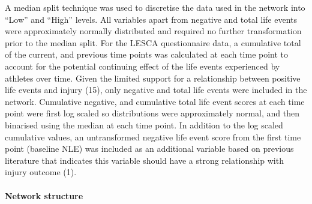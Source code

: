 \documentclass[
  english,
  man]{apa6}
\let\oldparagraph\paragraph
\renewcommand{\paragraph}[1]{\oldparagraph{#1}\mbox{}}
\begin{document}
A median split technique was used to discretise the data used in the network into ``Low'' and ``High'' levels.
All variables apart from negative and total life events were approximately normally distributed and required no further transformation prior to the median split.
For the LESCA questionnaire data, a cumulative total of the current, and previous time points was calculated at each time point to account for the potential continuing effect of the life events experienced by athletes over time.
Given the limited support for a relationship between positive life events and injury (15), only negative and total life events were included in the network.
Cumulative negative, and cumulative total life event scores at each time point were first log scaled so distributions were approximately normal, and then binarised using the median at each time point.
In addition to the log scaled cumulative values, an untransformed negative life event score from the first time point (baseline NLE) was included as an additional variable based on previous literature that indicates this variable should have a strong relationship with injury outcome (1).

\hypertarget{network-structure}{%
\paragraph{Network structure}\label{network-structure}}
\end{document}

